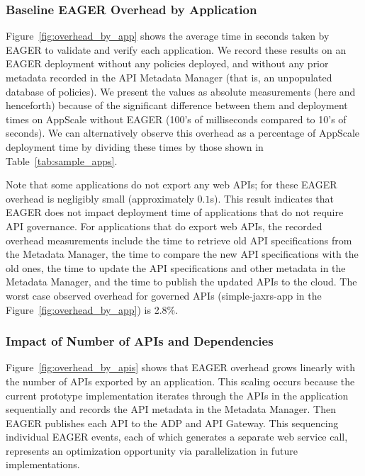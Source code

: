 \subsubsection{Baseline EAGER Overhead by Application}

Figure~\ref{fig:overhead_by_app} shows the average time in seconds taken by EAGER to validate and 
verify each application.  We record these results on an EAGER deployment without any policies 
deployed, and without any prior metadata recorded in the API Metadata Manager 
(that is, an unpopulated database of policies).
We present the values as absolute measurements (here and henceforth) because
of the significant difference between them and 
deployment times on AppScale without EAGER (100's of milliseconds compared to 10's of seconds).  
We can alternatively observe this overhead as a 
percentage of AppScale deployment time by dividing these times by 
those shown in Table~\ref{tab:sample_apps}.

Note that some applications do not export any web APIs;
for these EAGER overhead is negligibly small (approximately $0.1$s). 
This result indicates that EAGER does not impact deployment time of applications 
that do not require API governance.  For applications that do
export web APIs, the recorded overhead measurements include the time
to retrieve old API specifications from the Metadata Manager, the time 
to compare the new API specifications with the old ones, the time to
update the API specifications and other metadata in the Metadata Manager, and
the time to publish the updated APIs to the cloud.  
The worst case observed overhead for governed APIs (simple-jaxrs-app in the
Figure~\ref{fig:overhead_by_app}) is 2.8\%.

\subsubsection{Impact of Number of APIs and Dependencies}

Figure~\ref{fig:overhead_by_apis} shows that EAGER overhead grows linearly
with the number of APIs exported by an application.  This scaling occurs
because the current prototype implementation iterates through the APIs in the
application sequentially and records the API metadata in the Metadata Manager.
Then EAGER publishes each API to the ADP and API Gateway. This sequencing
individual EAGER events, each of which generates a separate web service call,
represents an optimization opportunity via parallelization in future implementations.

